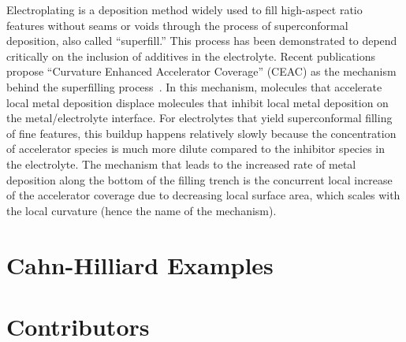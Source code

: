 \documentclass[tocAsPDFpart]{fipy}
\begin{document}
Electroplating is a deposition method widely used to fill high-aspect
ratio features without seams or voids through the process of
superconformal deposition, also called ``superfill.''  This process
has been demonstrated to depend critically on the inclusion of
additives in the electrolyte.  Recent publications propose ``Curvature
Enhanced Accelerator Coverage'' (CEAC) as the mechanism behind the
superfilling process~\cite{NIST:damascene:2001}.  In this mechanism,
molecules that accelerate local metal deposition displace molecules
that inhibit local metal deposition on the metal/electrolyte
interface. For electrolytes that yield superconformal filling of fine
features, this buildup happens relatively slowly because the
concentration of accelerator species is much more dilute compared to
the inhibitor species in the electrolyte.  The mechanism that leads to
the increased rate of metal deposition along the bottom of the filling
trench is the concurrent local increase of the accelerator coverage
due to decreasing local surface area, which scales with the local
curvature (hence the name of the mechanism).



\chapter{Cahn-Hilliard Examples}




\backmatter


\fussy

% 



\printindex

\appendix 


\chapter*{Contributors}
\label{chap:Contributors}



\end{document}
